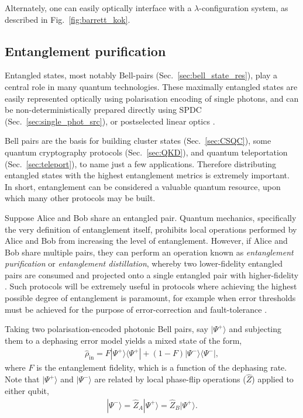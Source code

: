 \documentclass[aps,rmp,twocolumn,amsmath,amssymb,nofootinbib,superscriptaddress,longbibliography,floatfix]{revtex4-1}
\newcommand{\bra}[1]{\langle#1|}
\newcommand{\ket}[1]{|#1\rangle}
\begin{document}
Alternately, one can easily optically interface with a $\lambda$-configuration system, as described in Fig.~\ref{fig:barrett_kok}. 

%
%

\subsection{Entanglement purification} \label{sec:ent_purif}

Entangled states, most notably Bell-pairs (Sec.~\ref{sec:bell_state_res}), play a central role in many quantum technologies. These maximally entangled states are easily represented optically using polarisation encoding of single photons, and can be non-deterministically prepared directly using SPDC (Sec.~\ref{sec:single_phot_src}), or postselected linear optics \cite{???}.

Bell pairs are the basis for building cluster states (Sec.~\ref{sec:CSQC}), some quantum cryptography protocols (Sec.~\ref{sec:QKD}), and quantum teleportation (Sec.~\ref{sec:teleport}), to name just a few applications. Therefore distributing entangled states with the highest entanglement metrics is extremely important. In short, entanglement can be considered a valuable quantum resource, upon which many other protocols may be built.

Suppose Alice and Bob share an entangled pair. Quantum mechanics, specifically the very definition of entanglement itself, prohibits local operations performed by Alice and Bob from increasing the level of entanglement. However, if Alice and Bob share multiple pairs, they can perform an operation known as \emph{entanglement purification} or \emph{entanglement distillation}, whereby two lower-fidelity entangled pairs are consumed and projected onto a single entangled pair with higher-fidelity \cite{???}. Such protocols will be extremely useful in protocols where achieving the highest possible degree of entanglement is paramount, for example when error thresholds must be achieved for the purpose of error-correction and fault-tolerance \cite{bib:NielsenChuang00}.

Taking two polarisation-encoded photonic Bell pairs, say $\ket{\Psi^+}$ and subjecting them to a dephasing error model yields a mixed state of the form,
\begin{align}
\hat\rho_\mathrm{in} = F\ket{\Psi^+}\bra{\Psi^+} + (1-F)\ket{\Psi^-}\bra{\Psi^-},
\end{align}
where $F$ is the entanglement fidelity, which is a function of the dephasing rate. Note that $\ket{\Psi^+}$ and $\ket{\Psi^-}$ are related by local phase-flip operations ($\hat{Z}$) applied to either qubit,
\begin{align} \label{eq:psi_minus}
\ket{\Psi^-} = \hat{Z}_A \ket{\Psi^+} = \hat{Z}_B \ket{\Psi^+}.
\end{align}
\end{document}
